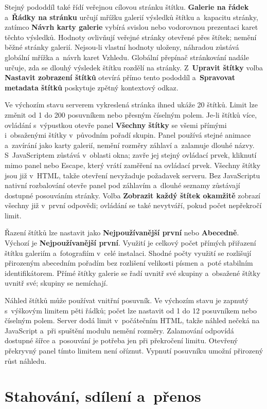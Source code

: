 \documentclass[11pt,a4paper]{article}
\newcommand{\ui}[1]{\textbf{#1}}
\begin{document}
Stejný pododdíl také řídí veřejnou cílovou stránku štítku. \ui{Galerie na řádek}
a~\ui{Řádky na stránku} určují mřížku galerií výsledků štítku a~kapacitu
stránky, zatímco \ui{Návrh karty galerie} vybírá svislou nebo vodorovnou
prezentaci karet těchto výsledků. Hodnoty ovlivňují veřejné stránky otevřené
přes štítek; nemění běžné stránky galerií. Nejsou-li vlastní hodnoty uloženy,
náhradou zůstává globální mřížka a~návrh karet Vzhledu. Globální přepínač
stránkování nadále určuje, zda se dlouhý výsledek štítku rozdělí na stránky.
Z~\ui{Upravit štítky} volba \ui{Nastavit zobrazení štítků} otevírá přímo tento
pododdíl a~\ui{Spravovat metadata štítků} poskytuje zpětný kontextový odkaz.

Ve výchozím stavu serverem vykreslená stránka ihned ukáže 20 štítků. Limit lze
změnit od 1 do 200 posuvníkem nebo přesným číselným polem. Je-li štítků více,
ovládání s~výpustkou otevře panel \ui{Všechny štítky} se všemi přímými
i~obsaženými štítky v~původním pořadí skupin. Panel používá stejné animace
a~zavírání jako karty galerií, nemění rozměry záhlaví a~zalamuje dlouhé názvy.
S~JavaScriptem zůstává v~oblasti okna; zavře jej stejný ovládací prvek, kliknutí
mimo panel nebo Escape, který vrátí zaměření na ovládací prvek. Všechny štítky
jsou již v~HTML, takže otevření nevyžaduje požadavek serveru. Bez JavaScriptu
nativní rozbalování otevře panel pod záhlavím a~dlouhé seznamy zůstávají
dostupné posouváním stránky. Volba \ui{Zobrazit každý štítek okamžitě} zobrazí
všechny již v~první odpovědi; ovládání se také nevytváří, pokud počet nepřekročí
limit.

Řazení štítků lze nastavit jako \ui{Nejpoužívanější první} nebo \ui{Abecedně}.
Výchozí je \ui{Nejpoužívanější první}. Využití je celkový počet přímých
přiřazení štítku galeriím a~fotografiím v~celé instalaci. Shodné počty využití
se rozlišují přirozeným abecedním pořadím bez rozlišení velikosti písmen a~poté
stabilním identifikátorem. Přímé štítky galerie se řadí uvnitř své skupiny
a~obsažené štítky uvnitř své; skupiny se nemíchají.

Náhled štítků může používat vnitřní posuvník. Ve výchozím stavu je zapnutý
s~výškovým limitem pěti řádků; počet lze nastavit od 1 do 12 posuvníkem nebo
číselným polem. Server dodá limit v~počátečním HTML, takže náhled nečeká na
JavaScript a~při spuštění modulu nemění rozměry. Zalamování odpovídá dostupné
šířce a~posouvání je potřeba jen při překročení limitu. Otevřený překryvný panel
tímto limitem není oříznut. Vypnutí posuvníku umožní přirozený růst náhledu.
\section{Stahování, sdílení a~přenos}
\label{sec:sharing}
\end{document}
